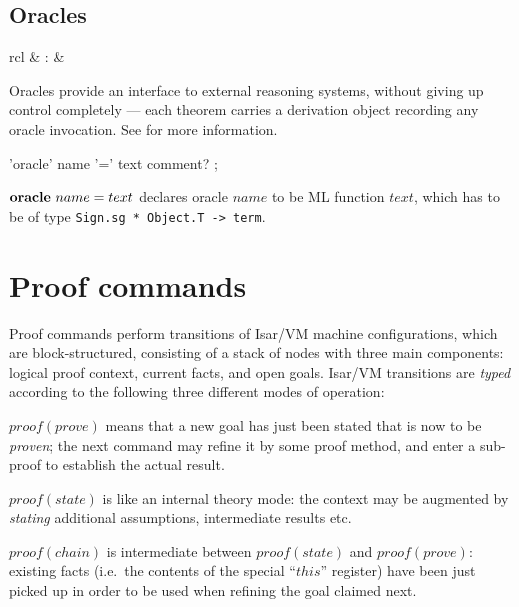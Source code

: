 \subsection{Oracles}

\begin{matharray}{rcl}
   & : &  \\
\end{matharray}

Oracles provide an interface to external reasoning systems, without giving up
control completely --- each theorem carries a derivation object recording any
oracle invocation.  See \cite[\S6]{isabelle-ref} for more information.

\begin{rail}
  'oracle' name '=' text comment?
  ;
\end{rail}

\begin{descr}
\item [${\mathord{\mathbf{oracle}}}~name=text$] declares oracle $name$ to be ML
  function $text$, which has to be of type
  \texttt{Sign.sg~*~Object.T~->~term}.
\end{descr}


\section{Proof commands}

Proof commands perform transitions of Isar/VM machine configurations, which
are block-structured, consisting of a stack of nodes with three main
components: logical proof context, current facts, and open goals.  Isar/VM
transitions are \emph{typed} according to the following three different modes
of operation:
\begin{descr}
\item [$proof(prove)$] means that a new goal has just been stated that is now
  to be \emph{proven}; the next command may refine it by some proof method,
  and enter a sub-proof to establish the actual result.
\item [$proof(state)$] is like an internal theory mode: the context may be
  augmented by \emph{stating} additional assumptions, intermediate results
  etc.
\item [$proof(chain)$] is intermediate between $proof(state)$ and
  $proof(prove)$: existing facts (i.e.\ the contents of the special ``$this$''
  register) have been just picked up in order to be used when refining the
  goal claimed next.
\end{descr}


